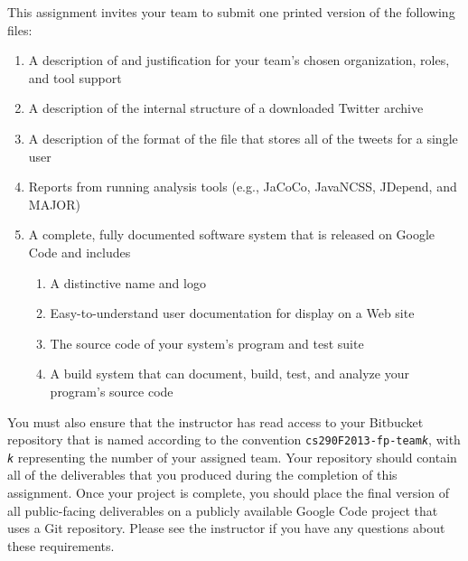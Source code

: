 This assignment invites your team to submit one printed version of the following files:
\vspace*{-.1in}
\begin{enumerate}
	\itemsep0em 
	\item A description of and justification for your team's chosen organization, roles, and tool support
	\item A description of the internal structure of a downloaded Twitter archive
	\item A description of the format of the file that stores all of the tweets for a single user
	\item Reports from running analysis tools (e.g., JaCoCo, JavaNCSS, JDepend, and MAJOR) 
	\item A complete, fully documented software system that is released on Google Code and includes
	\begin{enumerate}
		\item A distinctive name and logo
		\item Easy-to-understand user documentation for display on a Web site
		\item The source code of your system's program and test suite
		\item A build system that can document, build, test, and analyze your program's source code
	\end{enumerate}

\end{enumerate}
\vspace*{-.1in}

You must also ensure that the instructor has read access to your Bitbucket repository that is named according to the
convention {\tt cs290F2013-fp-team{\em k}}, with {\tt {\em k}} representing the number of your assigned team.  Your
repository should contain all of the deliverables that you produced during the completion of this assignment.  Once your
project is complete, you should place the final version of all public-facing deliverables on a publicly available Google
Code project that uses a Git repository. Please see the instructor if you have any questions about these requirements.
 


